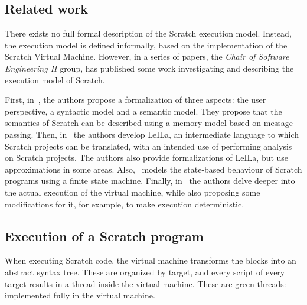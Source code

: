 \documentclass[../main]{subfiles}
\begin{document}
\subsection{Related work}\label{subsec:execution-related-work}

There exists no full formal description of the Scratch execution model.
Instead, the execution model is defined informally, based on the implementation of the Scratch Virtual Machine.
However, in a series of papers, the \emph{Chair of Software Engineering II} group, has published some work investigating and describing the execution model of Scratch.

First, in~\autocite{stahlbauerTestingScratchPrograms2019}, the authors propose a formalization of three aspects: the user perspective, a syntactic model and a semantic model.
They propose that the semantics of Scratch can be described using a memory model based on message passing.
Then, in~\autocite{stahlbauerVerifiedScratchProgram2020} the authors develop LeILa, an intermediate language to which Scratch projects can be translated, with an intended use of performing analysis on Scratch projects.
The authors also provide formalizations of LeILa, but use approximations in some areas.
Also,~\autocite{gotzModelbasedTestingScratch2022} models the state-based behaviour of Scratch programs using a finite state machine.
Finally, in~\autocite{deinerAutomatedTestGeneration2023} the authors delve deeper into the actual execution of the virtual machine, while also proposing some modifications for it, for example, to make execution deterministic.

\subsection{Execution of a Scratch program}\label{subsec:execution-of-a-scratch-program}

When executing Scratch code, the virtual machine transforms the blocks into an abstract syntax tree.
These are organized by target, and every script of every target results in a thread inside the virtual machine.
These are green threads: implemented fully in the virtual machine.
\end{document}
